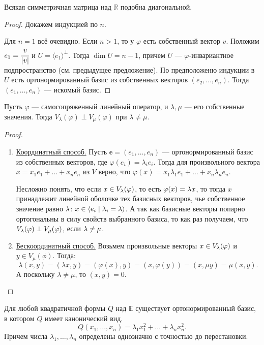 \begin{Consequence}
	Всякая симметричная матрица над $\mathbb{R}$ подобна диагональной.
\end{Consequence}

\begin{proof}
	Докажем индукцией по $n$.
	
	Для $n = 1$ всё очевидно. Если $n > 1$, то у $\varphi$ есть собственный вектор $v$. Положим $e_1 = \cfrac{v}{|v|}$ и $U = \langle e_1\rangle^\perp$. Тогда $\dim U = n - 1$, причем $U$ --- $\varphi$-инвариантное подпространство (см. предыдущее предложение). По предположеню индукции в $U$ есть ортонормированный базис из собственных векторов $(e_2,\ldots, e_n)$. Тогда $(e_1,\ldots, e_n)$ --- искомый базис.
\end{proof}

\begin{Consequence}
	Пусть $\varphi$ --- самосопряженный линейный оператор, и $\lambda, \mu$ --- его собственные значения. Тогда $V_\lambda(\varphi)\perp V_\mu(\varphi)$ при $\lambda \neq \mu$.
\end{Consequence}

\begin{proof}\ 
	\begin{enumerate} 
		\item \underline{Координатный способ.} Пусть $\mathbb{e} = (e_1, \ldots, e_n)$ --- ортонормированный базис из собственных векторов, где $\varphi(e_i) = \lambda_ie_i$. Тогда для произвольного вектора $x = x_1e_1 + \ldots + x_ne_n$ из $V$ верно, что $\varphi(x) = x_1\lambda_1 e_1 + \ldots + x_n \lambda_n e_n$.
		
		Несложно понять, что если $x \in V_\lambda(\varphi)$, то есть $\varphi(x) = \lambda x$, то тогда $x$ принадлежит линейной оболочке тех базисных векторов, чье собственное значение равно $\lambda$: $x \in \langle e_i \mid \lambda_i = \lambda \rangle$. А так как базисные векторы попарно ортогональны в силу свойств выбранного базиса, то как раз получаем, что $V_\lambda(\varphi) \perp V_\mu(\varphi)$, если $\lambda \neq \mu$.
		\item \underline{Бескоординатный способ.} Возьмем произвольные векторы $x \in V_\lambda(\varphi)$ и $y \in V_\mu(\phi)$. Тогда:
		$$
			\lambda(x,y) = (\lambda x, y) = (\varphi(x), y) = (x, \varphi(y)) = (x, \mu y) = \mu (x, y).
		$$
		А поскольку $\lambda \neq \mu$, то $(x,y) = 0$.
	\end{enumerate}
\end{proof}

\begin{Consequence}
	Для любой квадратичной формы $Q$ над $\mathbb{E}$ существует ортонормированный базис, в котором $Q$ имеет канонический вид. 
	$$
	Q(x_1, \ldots, x_n) = \lambda_1 x_1^2 + \ldots + \lambda_n x_n^2.
	$$
	Причем числа $\lambda_1, \ldots, \lambda_n$ определены однозначно с точностью до перестановки.
\end{Consequence}

